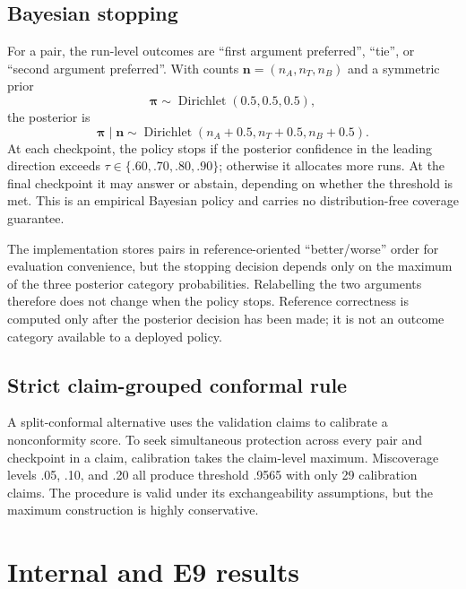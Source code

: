 \documentclass[11pt,twoside,a4paper]{report}
\begin{document}
\subsection{Bayesian stopping}

For a pair, the run-level outcomes are ``first argument preferred'', ``tie'', or
``second argument preferred''.  With counts
$\boldsymbol n=(n_A,n_T,n_B)$ and a symmetric prior
\begin{equation}
  \boldsymbol\pi\sim\operatorname{Dirichlet}(0.5,0.5,0.5),
\end{equation}
the posterior is
\begin{equation}
  \boldsymbol\pi\mid\boldsymbol n\sim
  \operatorname{Dirichlet}(n_A+0.5,n_T+0.5,n_B+0.5).
\end{equation}
At each checkpoint, the policy stops if the posterior confidence in the leading
direction exceeds $\tau\in\{.60,.70,.80,.90\}$; otherwise it allocates more runs.
At the final checkpoint it may answer or abstain, depending on whether the threshold
is met.  This is an empirical Bayesian policy and carries no distribution-free
coverage guarantee.

The implementation stores pairs in reference-oriented ``better/worse'' order for
evaluation convenience, but the stopping decision depends only on the maximum of the
three posterior category probabilities.  Relabelling the two arguments therefore
does not change when the policy stops.  Reference correctness is computed only after
the posterior decision has been made; it is not an outcome category available to a
deployed policy.

\subsection{Strict claim-grouped conformal rule}

A split-conformal alternative uses the validation claims to calibrate a
nonconformity score.  To seek simultaneous protection across every pair and
checkpoint in a claim, calibration takes the claim-level maximum.  Miscoverage
levels .05, .10, and .20 all produce threshold .9565 with only 29 calibration
claims.  The procedure is valid under its exchangeability assumptions, but the
maximum construction is highly conservative.

\section{Internal and E9 results}
\end{document}
